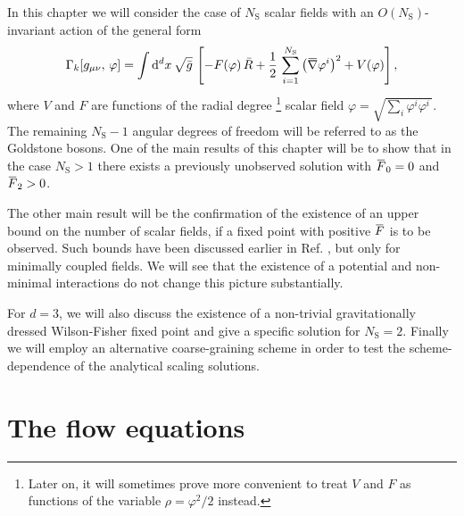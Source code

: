\documentclass[11pt]{book} %
\newcommand{\overbar}[1]{\mkern 1.5mu\overline{\mkern-1.5mu#1\mkern-1.5mu}\mkern 1.5mu}
\newcommand\gmunu{ g_{\mu\nu} }
\newcommand\NS{ N_{\scriptscriptstyle{\mathrm{S}}} }
\newcommand{\bnabla}{\overbar \nabla}
\newcommand{\bF}{\overbar F}
\numberwithin{equation}{chapter}
\begin{document}
In this chapter we will consider the case of $\NS$ scalar fields with
an $O(\NS)$-invariant action of the general form
\begin{align}
  \Gamma_k [\gmunu, \, \varphi] =
  \int \mathrm d^dx \, \sqrt{\bar g} \,
  \left[ - F(\varphi) \, \bar R + \frac{1}{2} \, \sum_{i=1}^{\NS} \left( \bnabla\varphi^i \right)^2 + V(\varphi)  \right] ,
  \label{action}
\end{align}
where $V$ and $F$ are functions of the radial degree%
\footnote{
Later on, it will sometimes prove more convenient to treat
$V$ and $F$ as functions of the variable $\rho=\varphi^2/2$ instead.
} scalar field
$\varphi=\sqrt{\sum_i \varphi^i \varphi^i \,}$.
The remaining $\NS-1$ angular degrees of freedom will be referred to as the Goldstone bosons.
One of the main results of this chapter will be to show that in the case
$\NS>1$ there exists a previously unobserved solution with $\bF_0=0$ and $\bF_2>0$.

The other main result will be the confirmation
of the existence  of an upper bound on the number of scalar fields,
if a fixed point with positive $\bF$ is to be observed.
Such bounds have been discussed earlier in Ref. \cite{Dona:2013qba},
but only for minimally coupled fields.
We will see that the existence of a potential and non-minimal interactions do
not change this picture substantially.

For $d=3$, we will also discuss the existence
of a non-trivial gravitationally dressed Wilson-Fisher fixed point
and give a specific solution for $\NS=2$.
Finally we will employ an alternative coarse-graining scheme
in order to test the scheme-dependence of the analytical scaling solutions.


\section{The flow equations}
\end{document}
